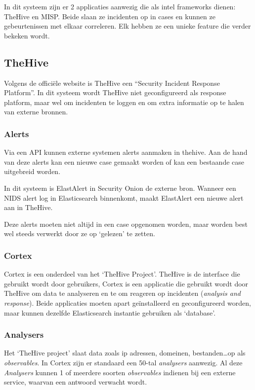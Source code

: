 \documentclass[a4paper,12pt]{report}
\begin{document}
In dit systeem zijn er 2 applicaties aanwezig die als intel frameworks dienen: TheHive en MISP.
Beide slaan ze incidenten op in cases en kunnen ze gebeurtenissen met elkaar correleren.
Elk hebben ze een unieke feature die verder bekeken wordt.

\subsection{TheHive}
Volgens de officiële website is TheHive een ``Security Incident Response Platform''.
\autocite{thehive:home}
In dit systeem wordt TheHive niet geconfigureerd als response platform, maar wel om incidenten te loggen en om extra informatie op te halen van externe bronnen.

\subsubsection{Alerts}
Via een API kunnen externe systemen alerts aanmaken in thehive.
Aan de hand van deze alerts kan een nieuwe case gemaakt worden of kan een bestaande case uitgebreid worden.

In dit systeem is ElastAlert in Security Onion de externe bron.
Wanneer een NIDS alert log in Elasticsearch binnenkomt, maakt ElastAlert een nieuwe alert aan in TheHive.

Deze alerts moeten niet altijd in een case opgenomen worden, maar worden best wel steeds verwerkt door ze op `gelezen' te zetten.

\subsubsection{Cortex}
\label{sec:cortex}
Cortex is een onderdeel van het `TheHive Project'.
TheHive is de interface die gebruikt wordt door gebruikers, Cortex is een applicatie die gebruikt wordt door TheHive om data te analyseren en te om reageren op incidenten (\emph{analysis and response}).
Beide applicaties moeten apart geïnstalleerd en geconfigureerd worden, maar kunnen dezelfde Elasticsearch instantie gebruiken als `database'.

\subsubsection{Analysers}
Het `TheHive project' slaat data zoals ip adressen, domeinen, bestanden\dots op als \emph{observables}.
In Cortex zijn er standaard een 50-tal \emph{analysers} aanwezig.
Al deze \emph{Analysers} kunnen 1 of meerdere soorten \emph{observables} indienen bij een externe service, waarvan een antwoord verwacht wordt.
\end{document}
